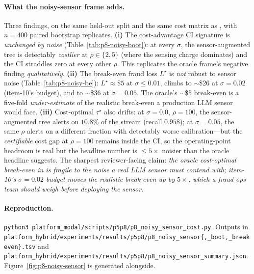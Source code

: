 \paragraph{What the noisy-sensor frame adds.} Three findings, on the
same held-out split and the same cost matrix as
, with $n{=}400$ paired bootstrap
replicates. \textbf{(i)} The cost-advantage CI signature is
\emph{unchanged by noise} (Table~\ref{tab:p8-noisy-boot}): at every
$\sigma$, the sensor-augmented tree is detectably \emph{costlier} at
$\rho \in \{2,5\}$ (where the sensing charge dominates) and the CI
straddles zero at every other $\rho$. This replicates the oracle frame's
negative finding \emph{qualitatively}. \textbf{(ii)} The break-even
fraud loss $L^\star$ is \emph{not} robust to sensor noise
(Table~\ref{tab:p8-noisy-be}): $L^\star \approx \$5$ at $\sigma \le 0.01$,
climbs to $\sim$\$26 at $\sigma{=}0.02$ (item-10's budget), and to
$\sim$\$36 at $\sigma{=}0.05$. The oracle's $\sim$\$5 break-even is a
five-fold \emph{under-estimate} of the realistic break-even a
production LLM sensor would face. \textbf{(iii)} Cost-optimal
$\tau^\star$ also drifts: at $\sigma{=}0.0$, $\rho{=}100$, the
sensor-augmented tree alerts on $10.8\%$ of the stream (recall
$0.958$); at $\sigma{=}0.05$, the same $\rho$ alerts on a different
fraction with detectably worse calibration---but the
\emph{certifiable} cost gap at $\rho{=}100$ remains inside the CI, so
the operating-point headroom is real but the headline number is
$\le 5\times$ noisier than the oracle headline suggests. The sharpest
reviewer-facing claim: \emph{the oracle cost-optimal break-even in
 is fragile to the noise a real
LLM sensor must contend with; item-10's $\sigma{=}0.02$ budget moves
the realistic break-even up by $5\times$, which a fraud-ops team
should weigh before deploying the sensor.}

\paragraph{Reproduction.}
\texttt{python3 platform\_modal/scripts/p5p8/p8\_noisy\_sensor\_cost.py}. Outputs in
\texttt{platform\_hybrid/experiments/results/p5p8/p8\_noisy\_sensor\{,\_boot,\_breakeven\}.tsv}
and \texttt{platform\_hybrid/experiments/results/p5p8/p8\_noisy\_sensor\_summary.json}.
Figure~\ref{fig:p8-noisy-sensor} is generated alongside.

